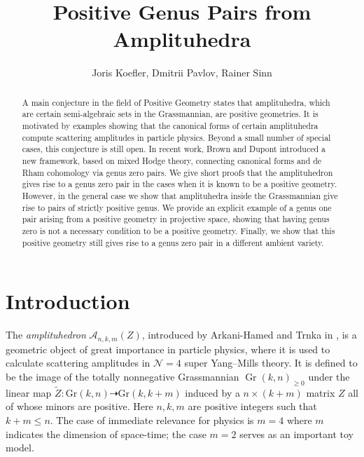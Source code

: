 \documentclass[12pt]{extarticle}
\title{Positive Genus Pairs from Amplituhedra}
\author{Joris Koefler, Dmitrii Pavlov, Rainer Sinn}
\date{}
\theoremstyle{definition}
\theoremstyle{theorem}
\theoremstyle{remark}
\numberwithin{equation}{section}
\DeclareMathOperator{\gr}{Gr}
\begin{document}
\maketitle
 
\begin{abstract}
A main conjecture in the field of Positive Geometry states that amplituhedra, which are certain semi-algebraic sets in the Grassmannian, are positive geometries. It is motivated by examples showing that the canonical forms of certain amplituhedra compute scattering amplitudes in particle physics. Beyond a small number of special cases, this conjecture is still open. In recent work, Brown and Dupont introduced a new framework, based on mixed Hodge theory, connecting canonical forms and de Rham cohomology via genus zero pairs.
We give short proofs that the amplituhedron gives rise to a genus zero pair in the cases when it is known to be a positive geometry. 
However, in the general case we show that amplituhedra inside the Grassmannian give rise to pairs of strictly positive genus.
We provide an explicit example of a genus one pair arising from a positive geometry in projective space, showing that having genus zero is not a necessary condition to be a positive geometry.
Finally, we show that this positive geometry still gives rise to a genus zero pair in a different ambient variety. 
\end{abstract}


\section{Introduction}
The \emph{amplituhedron} $\mathcal{A}_{n,k,m}(Z)$, introduced by Arkani-Hamed and Trnka in \cite{Amplituhedron}, is a geometric object of great importance in particle physics, where it is used to calculate scattering amplitudes in $\mathcal{N}=4$ super Yang--Mills theory.
It is defined to be the image of the totally nonnegative Grassmannian $\gr(k,n)_{\geq 0}$ \cite{postnikov} under the linear map $\tilde{Z}:\mathrm{Gr}(k,n)\dashrightarrow\mathrm{Gr}(k,k+m)$ induced by a $n\times (k+m)$ matrix $Z$ all of whose minors are positive. 
Here $n,k,m$ are positive integers such that $k+m\leq n$. 
The case of immediate relevance for physics is $m=4$ where $m$ indicates the dimension of space-time; the case $m=2$ serves as an important toy model.
\end{document}
